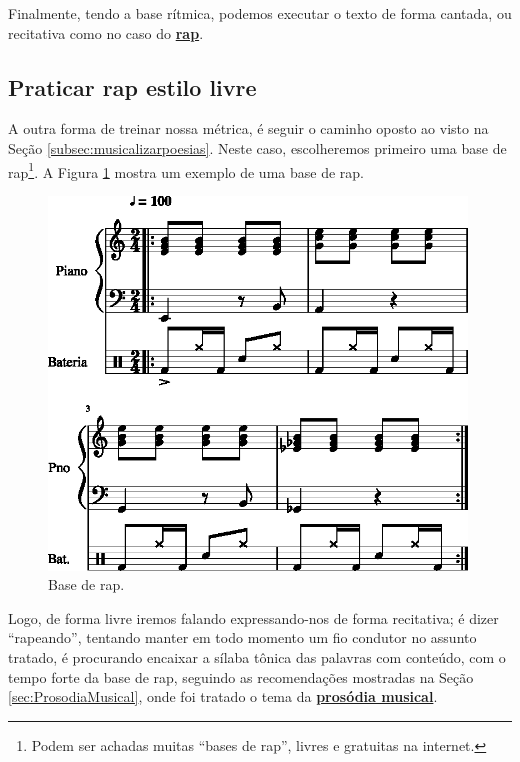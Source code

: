 Finalmente, tendo a base rítmica, podemos executar o texto de forma cantada,
ou recitativa como no caso do \hyperref[ref:RAP]{\textbf{rap}}.

\subsection{Praticar rap estilo livre}
\label{subsec:praticarrap}
A outra forma de treinar nossa métrica, 
é seguir o caminho oposto ao visto na Seção \ref{subsec:musicalizarpoesias}.
Neste caso, escolheremos primeiro uma base de rap\footnote{Podem ser achadas muitas ``bases de rap'',
livres e gratuitas na internet.}.
A Figura \ref{rap:base-rap} mostra um exemplo de uma base de rap.

\begin{figure}[H]
\centering
    \centering
    \includegraphics[width=0.99\textwidth]{chapters/cap-musicalidade-tecnica/base-rap-1.eps}
\caption{Base de rap.}
\label{rap:base-rap}
\end{figure}


Logo, de forma livre iremos falando expressando-nos  de forma recitativa;
é dizer ``rapeando'', tentando manter em todo momento um fio condutor no assunto tratado,
é procurando encaixar a sílaba tônica das palavras com conteúdo,
com o tempo forte da base de rap, seguindo as recomendações mostradas na Seção \ref{sec:ProsodiaMusical},
onde foi tratado o tema da \hyperref[sec:ProsodiaMusical]{\textbf{prosódia musical}}.
